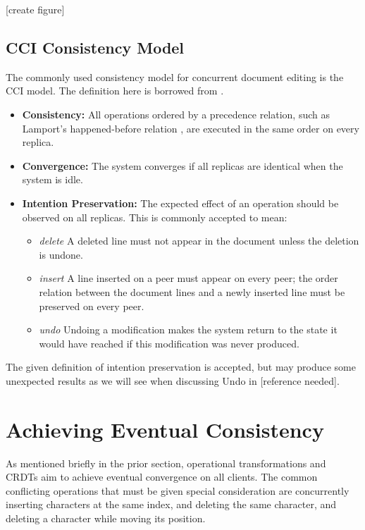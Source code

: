 \documentclass[12pt,a4paper,twoside,openright]{report}
\begin{document}
	[create figure]
	
	\subsection{CCI Consistency Model}
	The commonly used consistency model for concurrent document editing is the CCI model. The definition here is borrowed from \cite{weiss2010undo}.
	
	\begin{itemize}
		\item \textbf{Consistency:} All operations ordered by a precedence relation, such as Lamport’s happened-before relation \cite{lamport1978}, are executed in the same order on every replica.
	
		\item \textbf{Convergence:} The system converges if all replicas are identical when the system is idle.
		
		\item \textbf{Intention Preservation:} The expected effect of an operation should be observed on all replicas. This is commonly accepted to mean:

			\begin{itemize}
				\item \textit{delete}  A deleted line must not appear in the document unless the deletion is undone.
				
				\item \textit{insert}  A line inserted on a peer must appear on every peer; the order relation between the document lines and a newly inserted line must be preserved on every peer.
				
				\item  \textit{undo}  Undoing a modification makes the system return to the state it would have reached if this modification was never produced.
				
			\end{itemize}	
		
	\end{itemize}
	
	The given definition of intention preservation is accepted, but may produce some unexpected results as we will see when discussing Undo in [reference needed].
	

\section{Achieving Eventual Consistency}

	As mentioned briefly in the prior section, operational transformations and CRDTs aim to achieve eventual convergence on all clients. The common conflicting operations that must be given special consideration are concurrently inserting characters at the same index, and deleting the same character, and deleting a character while moving its position.
\end{document}
